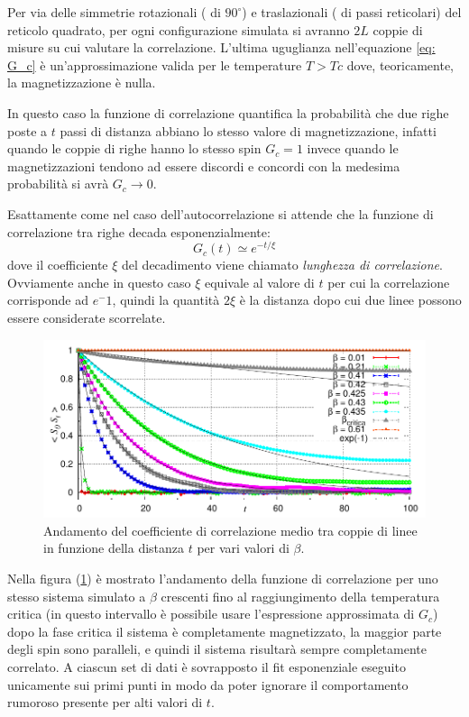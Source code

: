 Per via delle simmetrie rotazionali ( di $90^\circ$) e traslazionali ( di passi reticolari) del reticolo quadrato, per ogni configurazione simulata si avranno $2L$ coppie di misure su cui valutare la correlazione.
L'ultima uguglianza nell'equazione \ref{eq: G_c} è un'approssimazione valida per le temperature $T>Tc$ dove, teoricamente, la magnetizzazione è nulla. 

In questo caso la funzione di correlazione quantifica la probabilità che due righe poste a $t$ passi di distanza abbiano lo stesso valore di magnetizzazione, infatti quando le coppie di righe hanno lo stesso spin $G_c = 1$ invece quando le magnetizzazioni tendono ad essere discordi e concordi con la medesima probabilità si avrà $G_c \rightarrow 0 $.
\medskip

Esattamente come nel caso dell'autocorrelazione si attende che la funzione di correlazione tra righe decada esponenzialmente:
\begin{equation}
G_c(t) \simeq e^{-t/\xi}
\end{equation}
dove il coefficiente $\xi$ del decadimento viene chiamato \emph{lunghezza di correlazione}.
Ovviamente anche in questo caso $\xi$ equivale al valore di $t$ per cui la correlazione corrisponde ad $e^-1$, quindi la quantità $2 \xi$ è la distanza dopo cui due linee possono essere considerate scorrelate.
\begin{figure}[h!]
   \caption[ParteC$\_$StS0vst$\_$Cluster.cpp ]{Andamento del coefficiente di correlazione medio tra coppie di linee in funzione della distanza $t$ per vari valori di $\beta$.}\label{fig: Cluster_S0Stvst}
     \centering
\includegraphics[width=1\textwidth]{Immagini/ParteC/Cluster_S0Stvst}
\end{figure}


\bigskip
Nella figura (\ref{fig: Cluster_S0Stvst}) è mostrato l'andamento della funzione di correlazione per uno stesso sistema simulato a $\beta$ crescenti fino al raggiungimento della temperatura critica (in questo intervallo è possibile usare l'espressione approssimata di $G_c$) dopo la fase critica il sistema è completamente magnetizzato, la maggior parte degli spin sono paralleli, e quindi il sistema risultarà sempre completamente correlato.
A ciascun set di dati è sovrapposto il fit esponenziale eseguito unicamente sui primi punti in modo da poter ignorare il comportamento rumoroso presente per alti valori di $t$.

